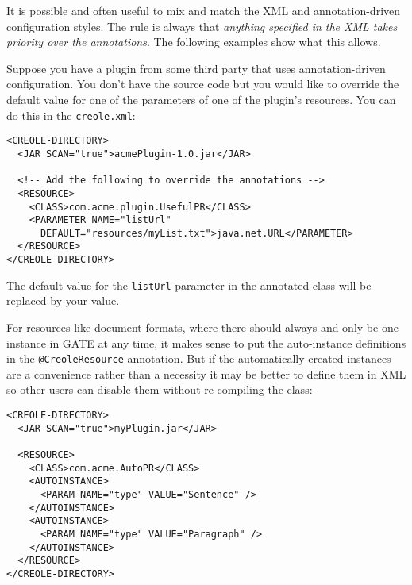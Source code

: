 It is possible and often useful to mix and match the XML and annotation-driven
configuration styles.  The rule is always that \emph{anything specified in the
XML takes priority over the annotations}.  The following examples show what
this allows.


Suppose you have a plugin from some third party that uses annotation-driven
configuration.  You don't have the source code but you would like to override
the default value for one of the parameters of one of the plugin's resources.
You can do this in the {\tt creole.xml}:
\begin{small}\begin{verbatim}
<CREOLE-DIRECTORY>
  <JAR SCAN="true">acmePlugin-1.0.jar</JAR>

  <!-- Add the following to override the annotations -->
  <RESOURCE>
    <CLASS>com.acme.plugin.UsefulPR</CLASS>
    <PARAMETER NAME="listUrl"
      DEFAULT="resources/myList.txt">java.net.URL</PARAMETER>
  </RESOURCE>
</CREOLE-DIRECTORY>
\end{verbatim}\end{small}

The default value for the {\tt listUrl} parameter in the annotated class will
be replaced by your value.


For resources like document formats, where there should always and only be one
instance in GATE at any time, it makes sense to put the auto-instance
definitions in the \verb|@CreoleResource| annotation.  But if the automatically
created instances are a convenience rather than a necessity it may be better
to define them in XML so other users can disable them without re-compiling the
class:
\begin{small}\begin{verbatim}
<CREOLE-DIRECTORY>
  <JAR SCAN="true">myPlugin.jar</JAR>

  <RESOURCE>
    <CLASS>com.acme.AutoPR</CLASS>
    <AUTOINSTANCE>
      <PARAM NAME="type" VALUE="Sentence" />
    </AUTOINSTANCE>
    <AUTOINSTANCE>
      <PARAM NAME="type" VALUE="Paragraph" />
    </AUTOINSTANCE>
  </RESOURCE>
</CREOLE-DIRECTORY>
\end{verbatim}\end{small}

